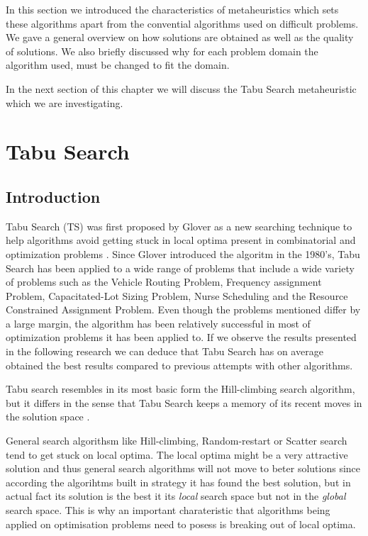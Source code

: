 In this section we introduced the characteristics of metaheuristics which sets these algorithms apart from the convential algorithms used on difficult problems. We gave a general overview on how solutions are obtained as well as the quality of solutions. We also briefly discussed why for each problem domain the algorithm used, must be changed to fit the domain. 

In the next section of this chapter we will discuss the Tabu Search metaheuristic which we are investigating.
\section{Tabu Search}
\subsection{Introduction}
Tabu Search (TS) was first proposed by Glover as a new searching technique to help algorithms avoid getting  stuck in local optima present in combinatorial and optimization problems \cite{TabuRCAProblem}. Since Glover introduced the algoritm in the 1980's, Tabu Search has been applied to a wide range of problems that include a wide variety of problems such as the Vehicle Routing Problem, Frequency assignment Problem, Capacitated-Lot Sizing Problem, Nurse Scheduling and the Resource Constrained Assignment Problem. Even though the problems mentioned differ by a large margin, the algorithm has been relatively successful in most of optimization problems it has been applied to. If we observe the results presented in the following research \cite{TabuCarryOver,TabuSingleMachineScheduling,TabuVechicleRoutingWithTimeWindows,TabuBiddingStrats,TabuCrewSchedulingProblem,ReactiveTabuVHR,TabuRCAProblem,TabuCSP,TabuMontemanniSmith,tabuglobalplanning3g} we can deduce that Tabu Search has on average obtained the best results compared to previous attempts with other algorithms. 

Tabu search resembles in its most basic form the Hill-climbing search algorithm, but it differs in the sense that Tabu Search keeps a memory of its recent moves in the solution space \cite{TabuBiddingStrats}. 

General search algorithsm like Hill-climbing, Random-restart or Scatter search tend to get stuck on local optima. The local optima might be a very attractive solution and thus general search algorithms will not move to beter solutions since according the algorihtms built in strategy it has found the best solution, but in actual fact its solution is the best it its \emph{local} search space but not in the \emph{global} search space. This is why an important charateristic that algorithms being applied on optimisation problems need to posess is breaking out of local optima.

